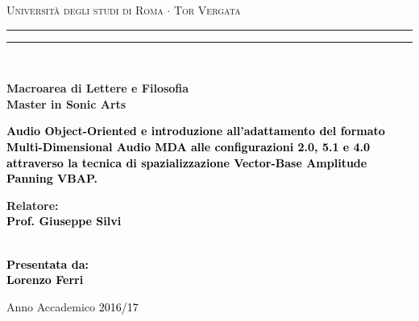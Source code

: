 \documentclass[12pt,a4paper]{report}
\begin{document}
\begin{titlepage}
\begin{center}
{\Large{\textsc{Università degli studi di Roma $\cdot$ Tor Vergata}}}
\rule[0.1cm]{15.8cm}{0.1mm}
\rule[0.5cm]{15.8cm}{0.6mm}
\\\vspace{3mm}

{\small{\bf Macroarea di Lettere e Filosofia \\ Master in Sonic Arts}}

\end{center}

\vspace{23mm}

\begin{center}
\begin{spacing}{1.7}
\textcolor{black}{
\linespread{5}
{\LARGE{\bf
Audio Object-Oriented e introduzione all'adattamento del formato Multi-Dimensional Audio MDA alle configurazioni 2.0, 5.1 e 4.0 attraverso la tecnica di spazializzazione Vector-Base Amplitude Panning VBAP.
}}}

\end{spacing}
\end{center}

\vspace{50mm} \par \noindent

\begin{minipage}[t]{0.47\textwidth}

{\large{\bf Relatore: \vspace{2mm}\\\textcolor{black}{
Prof. Giuseppe Silvi}\\\\

}
}
\end{minipage}
%
\hfill
%
\begin{minipage}[t]{0.47\textwidth}\raggedleft \textcolor{black}{
{\large{\bf Presentata da:
\vspace{2mm}\\
Lorenzo Ferri}}}
\end{minipage}

\vspace{5mm}

\begin{center}

{\large{%

Anno Accademico \textcolor{black}{2016/17}}}
\end{center}

\newpage\null\thispagestyle{empty}

\end{titlepage}
\end{document}
